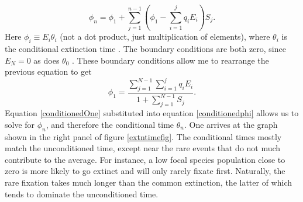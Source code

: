 \begin{equation}
\phi_n = \phi_1 + \sum_{j=1}^{n-1}\left(\phi_1 - \sum_{i=1}^{j}q_iE_i\right)S_{j}.  %
 \label{conditionedphi}
\end{equation}
Here $\phi_i \equiv E_i \theta_i$ (not a dot product, just multiplication of elements), where $\theta_i$ is the conditional extinction time \cite{Iyer-Biswas2015}. %
The boundary conditions are both zero, since $E_N=0$ as does $\theta_0$ \cite{Nisbet1982}. 
These boundary conditions allow me to rearrange the previous equation to get
\begin{equation}
\phi_1 = \frac{\sum_{j=1}^{N-1}\sum_{i=1}^{j}q_iE_i}{1+\sum_{j=1}^{N-1}S_j}. 
 \label{conditionedOne}
\end{equation}
Equation \ref{conditionedOne} substituted into equation \ref{conditionedphi} allows us to solve for $\phi_n$, and therefore the conditional time $\theta_n$. %
One arrives at the graph shown in the right panel of figure \ref{extntimefig}. 
The conditional times mostly match the unconditioned time, except near the rare events that do not much contribute to the average. 
For instance, a low focal species population close to zero is more likely to go extinct and will only rarely fixate first. 
Naturally, the rare fixation takes much longer than the common extinction, the latter of which tends to dominate the unconditioned time. 



